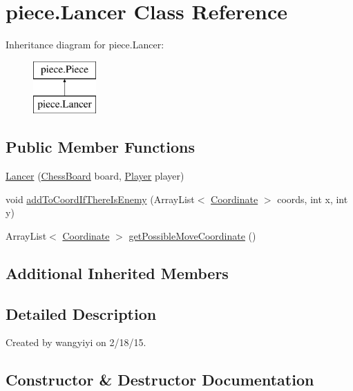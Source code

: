 \hypertarget{classpiece_1_1_lancer}{}\section{piece.\+Lancer Class Reference}
\label{classpiece_1_1_lancer}
Inheritance diagram for piece.\+Lancer\+:\begin{figure}[H]
\begin{center}
\leavevmode
\includegraphics[height=2.000000cm]{classpiece_1_1_lancer}
\end{center}
\end{figure}
\subsection*{Public Member Functions}
\begin{DoxyCompactItemize}
\item 
\hyperlink{classpiece_1_1_lancer_a50616ad4693ed4d3923a447ecc36d893}{Lancer} (\hyperlink{classchess_1_1_chess_board}{Chess\+Board} board, \hyperlink{enumchess_1_1_player}{Player} player)
\item 
void \hyperlink{classpiece_1_1_lancer_a2a1b43010845295b4e652ac1db26512f}{add\+To\+Coord\+If\+There\+Is\+Enemy} (Array\+List$<$ \hyperlink{classpiece_1_1_coordinate}{Coordinate} $>$ coords, int x, int y)
\item 
Array\+List$<$ \hyperlink{classpiece_1_1_coordinate}{Coordinate} $>$ \hyperlink{classpiece_1_1_lancer_ad347a5eb8ae6db14e7a112ae640d3c88}{get\+Possible\+Move\+Coordinate} ()
\end{DoxyCompactItemize}
\subsection*{Additional Inherited Members}


\subsection{Detailed Description}
Created by wangyiyi on 2/18/15. 

\subsection{Constructor \& Destructor Documentation}
\hypertarget{classpiece_1_1_lancer_a50616ad4693ed4d3923a447ecc36d893}{}
